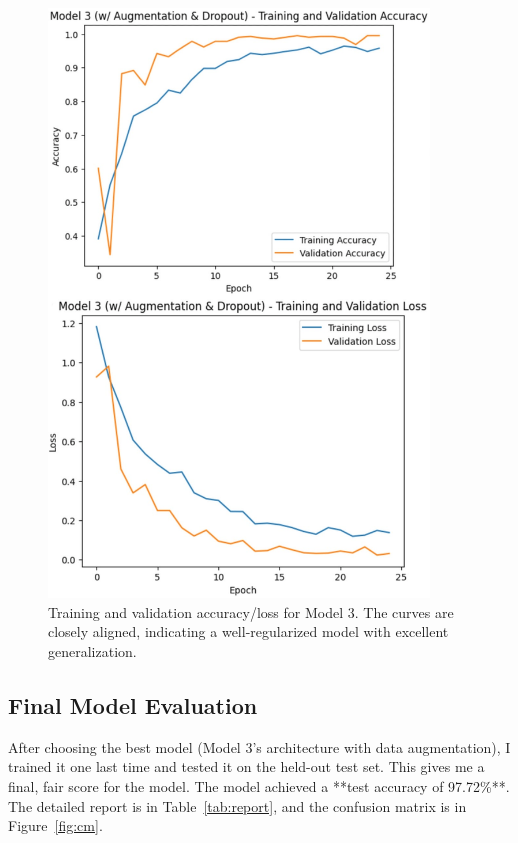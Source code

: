 \documentclass[pdflatex,sn-mathphys-num]{sn-jnl}%
\theoremstyle{thmstyleone}%
\theoremstyle{thmstyletwo}%
\theoremstyle{thmstylethree}%
\begin{document}
\begin{figure}[htbp]
\centering
\includegraphics[width=0.9\textwidth]{model3_curves.png}
\caption{Training and validation accuracy/loss for Model 3. The curves are closely aligned, indicating a well-regularized model with excellent generalization.}\label{fig:model3}
\end{figure}

\subsection{Final Model Evaluation}
After choosing the best model (Model 3's architecture with data augmentation), I trained it one last time and tested it on the held-out test set. This gives me a final, fair score for the model. The model achieved a **test accuracy of 97.72\%**. The detailed report is in Table~\ref{tab:report}, and the confusion matrix is in Figure~\ref{fig:cm}.
\end{document}
